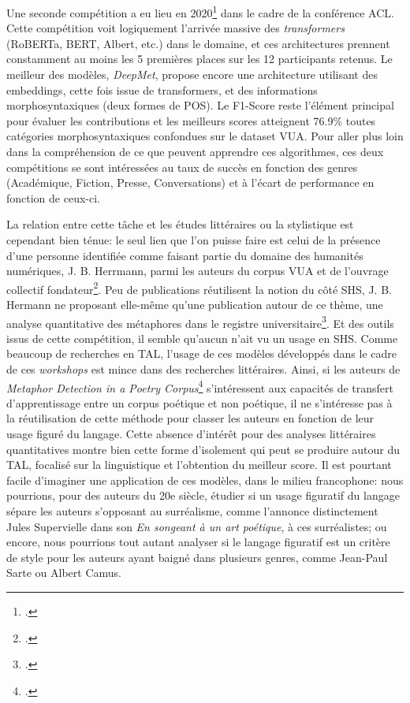 Une seconde compétition a eu lieu en 2020\footcite{leong_report_2020} dans le cadre de la conférence ACL. Cette compétition voit logiquement l'arrivée massive des \textit{transformers} (RoBERTa, BERT, Albert, etc.) dans le domaine, et ces architectures prennent constamment au moins les 5 premières places sur les 12 participants retenus. Le meilleur des modèles, \textit{DeepMet}, propose encore une architecture utilisant des embeddings, cette fois issue de transformers, et des informations morphosyntaxiques (deux formes de POS). Le F1-Score reste l'élément principal pour évaluer les contributions et les meilleurs scores atteignent 76.9\% toutes catégories morphosyntaxiques confondues sur le dataset VUA. Pour aller plus loin dans la compréhension de ce que peuvent apprendre ces algorithmes, ces deux compétitions se sont intéressées au taux de succès en fonction des genres (Académique, Fiction, Presse, Conversations) et à l'écart de performance en fonction de ceux-ci. %

La relation entre cette tâche et les études littéraires ou la stylistique est cependant bien ténue: le seul lien que l'on puisse faire est celui de la présence d'une personne identifiée comme faisant partie du domaine des humanités numériques, J. B. Herrmann, parmi les auteurs du corpus VUA et de l'ouvrage collectif fondateur\footcite{steen_method_2010}. Peu de publications réutilisent la notion du côté SHS, J. B. Hermann ne proposant elle-même qu'une publication autour de ce thème, une analyse quantitative des métaphores dans le registre universitaire\footcite{herrmann_high_2015}. Et des outils issus de cette compétition, il semble qu'aucun n'ait vu un usage en SHS. Comme beaucoup de recherches en TAL, l'usage de ces modèles développés dans le cadre de ces \textit{workshops} est mince dans des recherches littéraires. Ainsi, si les auteurs de \textit{Metaphor Detection in a Poetry Corpus}\footcite{kesarwani_metaphor_2017} s'intéressent aux capacités de transfert d'apprentissage entre un corpus poétique et non poétique, il ne s'intéresse pas à la réutilisation de cette méthode pour classer les auteurs en fonction de leur usage figuré du langage. Cette absence d'intérêt pour des analyses littéraires quantitatives montre bien cette forme d'isolement qui peut se produire autour du TAL, focalisé sur la linguistique et l'obtention du meilleur score. Il est pourtant facile d'imaginer une application de ces modèles, dans le milieu francophone: nous pourrions, pour des auteurs du 20e siècle, étudier si un usage figuratif du langage sépare les auteurs s'opposant au surréalisme, comme l'annonce distinctement Jules Supervielle dans son \textit{En songeant à un art poétique}, à ces surréalistes; ou encore, nous pourrions tout autant analyser si le langage figuratif est un critère de style pour les auteurs ayant baigné dans plusieurs genres, comme Jean-Paul Sarte ou Albert Camus.

